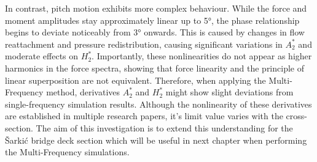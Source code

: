 \documentclass[../main]{subfiles}
\begin{document}
In contrast, pitch motion exhibits more complex behaviour. While the force and moment amplitudes stay approximately linear up to 5°, 
the phase relationship begins to deviate noticeably from 3° onwards. This is caused by changes in flow reattachment and 
pressure redistribution, causing significant variations in $A_2^*$ and moderate effects on $H_2^*$. 
Importantly, these nonlinearities do not appear as higher harmonics in the force spectra, showing that force linearity and the 
principle of linear superposition are not equivalent. Therefore, when applying the Multi-Frequency method, 
derivatives $A_2^*$ and $H_2^*$ might show slight deviations from single-frequency simulation results. Although the nonlinearity of 
these derivatives are established in multiple research papers, it's limit value varies with the cross-section. The aim of this investigation is to 
extend this understanding for the \v{S}arki\'c bridge deck section which will be useful in next chapter when performing the Multi-Frequency simulations.
\end{document}

